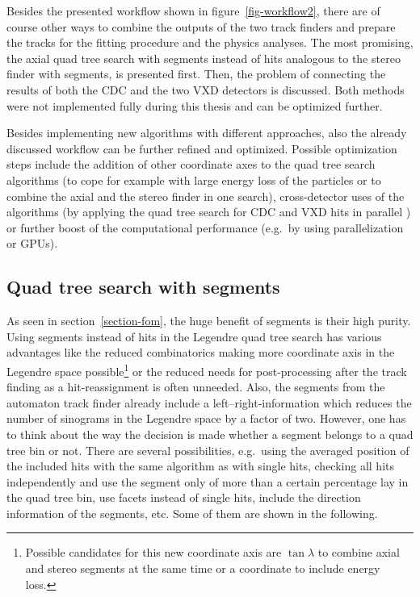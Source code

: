 Besides the presented workflow shown in figure~\ref{fig-workflow2}, there are of course other ways to combine the outputs of the two track finders and prepare the tracks for the fitting procedure and the physics analyses. The most promising, the axial quad tree search with segments instead of hits analogous to the stereo finder with segments, is presented first. Then, the problem of connecting the results of both the CDC and the two VXD detectors is discussed. Both methods were not implemented fully during this thesis and can be optimized further.

Besides implementing new algorithms with different approaches, also the already discussed workflow can be further refined and optimized. Possible optimization steps include the addition of other coordinate axes to the quad tree search algorithms (to cope for example with large energy loss of the particles or to combine the axial and the stereo finder in one search), cross-detector uses of the algorithms (by applying the quad tree search for CDC and VXD hits in parallel \cite{markus}) or further boost of the computational performance (e.g.\ by using parallelization or GPUs).

\subsection{Quad tree search with segments}

As seen in section~\ref{section-fom}, the huge benefit of segments is their high purity. Using segments instead of hits in the Legendre quad tree search has various advantages like the reduced combinatorics making more coordinate axis in the Legendre space possible\footnote{Possible candidates for this new coordinate axis are $\tan \lambda$ to combine axial and stereo segments at the same time or a coordinate to include energy loss.} or the reduced needs for post-processing after the track finding as a hit-reassignment is often unneeded. Also, the segments from the automaton track finder already include a left--right-information which reduces the number of sinograms in the Legendre space by a factor of two. However, one has to think about the way the decision is made whether a segment belongs to a quad tree bin or not. There are several possibilities, e.g.\ using the averaged position of the included hits with the same algorithm as with single hits, checking all hits independently and use the segment only of more than a certain percentage lay in the quad tree bin, use facets instead of single hits, include the direction information of the segments, etc. Some of them are shown in the following.

